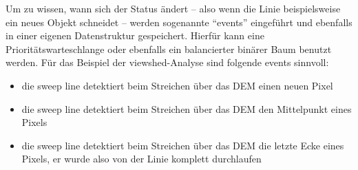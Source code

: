 Um zu wissen, wann sich der Status ändert -- also wenn die Linie beispielsweise ein neues Objekt schneidet -- werden sogenannte ``events'' eingeführt
und ebenfalls in einer eigenen Datenstruktur gespeichert. Hierfür kann eine Prioritätswarteschlange oder ebenfalls ein balancierter binärer Baum 
benutzt werden. Für das Beispiel der viewshed-Analyse sind folgende events sinnvoll: 
\begin{itemize}
 \item die sweep line detektiert beim Streichen über das DEM einen neuen Pixel
 \item die sweep line detektiert beim Streichen über das DEM den Mittelpunkt eines Pixels
 \item die sweep line detektiert beim Streichen über das DEM die letzte Ecke eines Pixels, er wurde also von der Linie komplett durchlaufen
\end{itemize}
